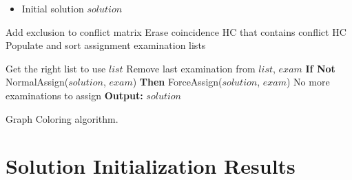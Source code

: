 
\begin{algorithm}
\begin{itemize}
\item Initial solution $solution$
\end{itemize}

\begin{algorithmic}[1]
\State Add exclusion to conflict matrix
\State Erase coincidence HC that contains conflict HC
\State Populate and sort assignment examination lists

\Repeat
	\State Get the right list to use $list$
	\State Remove last examination from $list$, $exam$
	\State \textbf{If Not} NormalAssign($solution$, $exam$) \textbf{Then} ForceAssign($solution$, $exam$)
\Until No more examinations to assign
\State  \textbf{Output:} $solution$
\end{algorithmic}
\caption{Graph Coloring algorithm.}
\label{alg:GraphColoring}
\end{algorithm}

\section{Solution Initialization Results}

